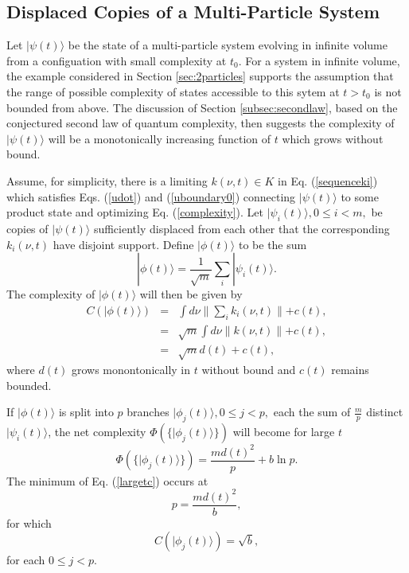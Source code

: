 \documentclass[12pt,amsmath,amssymb,onecolumn]{revtex4-2}
\begin{document}
\subsection{\label{subsec:general} Displaced Copies of a Multi-Particle System}

Let $|\psi(t) \rangle $ be the state of a multi-particle system
evolving in infinite volume from a configuation with small complexity at $t_0$.
For a system in infinite volume,
the example considered in Section \ref{sec:2particles} supports
the assumption that the range of
possible complexity of states accessible to this sytem at $t > t_0$
is not bounded from above.
The discussion of Section \ref{subsec:secondlaw},
based on the conjectured second law of quantum complexity, then
suggests the complexity of $|\psi(t) \rangle $ will
be a monotonically increasing function of $t$ which
grows without bound.

Assume, for simplicity, there is a limiting 
$k(\nu, t) \in K$ in Eq. (\ref{sequenceki})
which satisfies
Eqs. (\ref{udot}) and (\ref{uboundary0}) 
connecting
$|\psi(t) \rangle $ to some product state
and optimizing Eq. (\ref{complexity}).
Let
$|\psi_i(t) \rangle , 0 \le i < m,$ be copies of $|\psi(t) \rangle $
sufficiently displaced from each other
that the corresponding $k_i(\nu, t)$ have disjoint
support. Define $|\phi(t) \rangle $ to be the sum
\begin{equation}
  \label{defphit}
  |\phi(t) \rangle  = \frac{1}{\sqrt{m}} \sum_i |\psi_i(t) \rangle .
\end{equation}
The complexity of $|\phi(t) \rangle $ will then be given by
\begin{subequations}
  \begin{eqnarray}
    \label{cphi0}
    C(|\phi(t) \rangle ) & = & \int d \nu \parallel \sum_i k_i( \nu, t) \parallel + c(t), \\
    \label{cphi1}
    & = & \sqrt{m} \int d \nu \parallel k( \nu, t) \parallel + c(t), \\
    \label{cphi2}
    & = & \sqrt{m} d(t) + c(t),
  \end{eqnarray}
\end{subequations}
where $d(t)$ grows monontonically in $t$ without bound and
$c(t)$ remains bounded.

If $|\phi(t) \rangle $ is split into $p$ branches $|\phi_j(t) \rangle , 0 \le j < p,$ each
the sum of $\frac{m}{p}$ distinct $|\psi_i(t) \rangle $, the net complexity
$\Phi( \{ |\phi_j(t) \rangle  \})$ will become for large $t$
\begin{equation}
  \label{largetc}
  \Phi( \{ |\phi_j(t) \rangle  \}) = \frac{m d(t)^2}{p} + b \ln p.
\end{equation}
The minimum of Eq. (\ref{largetc}) occurs at
\begin{equation}
  \label{optlargetc}
  p = \frac{ m d(t)^2}{b},
\end{equation}
for which
\begin{equation}
  \label{optphic}
  C( |\phi_j(t) \rangle ) = \sqrt{b},
\end{equation}
for each $0 \le j < p$.
\end{document}
